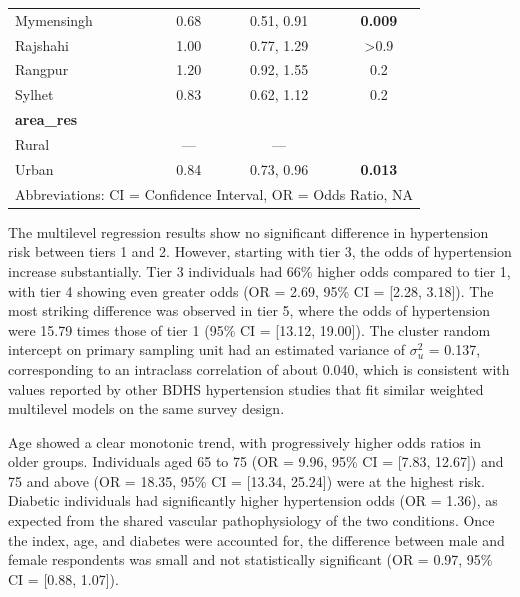 \documentclass[
  12pt,
  a4paper]{article}
\begin{document}
\begin{longtable}[t]{lccc}
\hspace{1em}Mymensingh & 0.68 & 0.51, 0.91 & \textbf{0.009}\\
\hspace{1em}Rajshahi & 1.00 & 0.77, 1.29 & >0.9\\
\hspace{1em}Rangpur & 1.20 & 0.92, 1.55 & 0.2\\
\hspace{1em}Sylhet & 0.83 & 0.62, 1.12 & 0.2\\
\textbf{area\_res} &  &  & \\
\hspace{1em}Rural & — & — & \\
\hspace{1em}Urban & 0.84 & 0.73, 0.96 & \textbf{0.013}\\*
\multicolumn{4}{l}{\rule{0pt}{1em}Abbreviations: CI = Confidence Interval, OR = Odds Ratio, NA}\\
\end{longtable}

The multilevel regression results show no significant difference in hypertension risk between tiers 1 and 2. However, starting with tier 3, the odds of hypertension increase substantially. Tier 3 individuals had 66\% higher odds compared to tier 1, with tier 4 showing even greater odds (OR = 2.69, 95\% CI = {[}2.28, 3.18{]}). The most striking difference was observed in tier 5, where the odds of hypertension were 15.79 times those of tier 1 (95\% CI = {[}13.12, 19.00{]}). The cluster random intercept on primary sampling unit had an estimated variance of \(\sigma^2_u\) = 0.137, corresponding to an intraclass correlation of about 0.040, which is consistent with values reported by other BDHS hypertension studies that fit similar weighted multilevel models on the same survey design.

Age showed a clear monotonic trend, with progressively higher odds ratios in older groups. Individuals aged 65 to 75 (OR = 9.96, 95\% CI = {[}7.83, 12.67{]}) and 75 and above (OR = 18.35, 95\% CI = {[}13.34, 25.24{]}) were at the highest risk. Diabetic individuals had significantly higher hypertension odds (OR = 1.36), as expected from the shared vascular pathophysiology of the two conditions. Once the index, age, and diabetes were accounted for, the difference between male and female respondents was small and not statistically significant (OR = 0.97, 95\% CI = {[}0.88, 1.07{]}).
\end{document}
